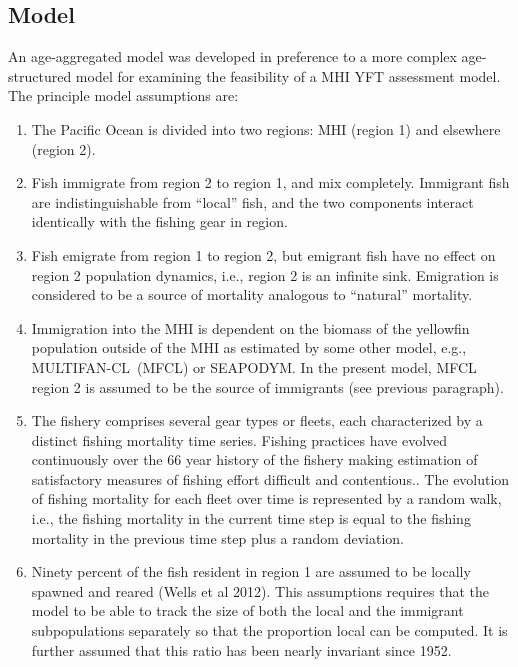 \documentclass[12pt,letterpaper,twoside]{article}
\newcommand\SD{SEAPODYM}
\newcommand\MFCL{MULTIFAN-CL}
\begin{document}
\subsection{Model}
An age-aggregated model was developed in preference to a more complex
age-structured model for examining the feasibility of a MHI YFT
assessment model.
The principle model assumptions are:
\begin{enumerate}
\item The Pacific Ocean is divided into two regions:
MHI (region 1) and elsewhere (region 2).
\item Fish immigrate from region 2 to region 1, and mix completely.
Immigrant fish are indistinguishable from ``local'' fish,
and the two components interact identically with the fishing gear in
region.
\item Fish emigrate from region 1 to region 2, but emigrant fish have
no effect on region 2 population dynamics, i.e., region 2 is an infinite
sink. Emigration is considered to be a source of mortality analogous
to ``natural'' mortality.
\item Immigration into the MHI is dependent on the
biomass of the yellowfin population outside of the MHI as estimated by
some other model, e.g., \MFCL\ (MFCL) or \SD. In the present model,
MFCL region 2 is assumed to be the source of immigrants (see previous
paragraph).
\item The fishery comprises several gear types or fleets, each
characterized by a distinct fishing mortality time series.
Fishing practices have evolved continuously over the 66 year history
of the fishery making estimation of satisfactory measures of fishing
effort difficult and contentious..
The evolution of fishing mortality for each fleet over time is
represented by a random walk,
i.e., the fishing mortality in the current time step is equal
to the fishing mortality in the previous time step plus a random
deviation.
\item Ninety percent of the fish resident in region 1 are assumed to
be locally spawned and reared (Wells et al 2012). 
This assumptions requires that the model to be able to track
the size of both the local and the immigrant subpopulations separately so
that the proportion local can be computed. It is
further assumed that this ratio has been nearly invariant since 1952.
\end{enumerate}
\end{document}
